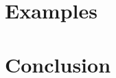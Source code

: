 \documentclass[12pt]{article}
\begin{document}
%
%

%
%
%
%

%
%
\section{Examples}
%
%

%
%
\section{Conclusion}
%
%


%
%
%
%

% 	
% 	
\end{document}

